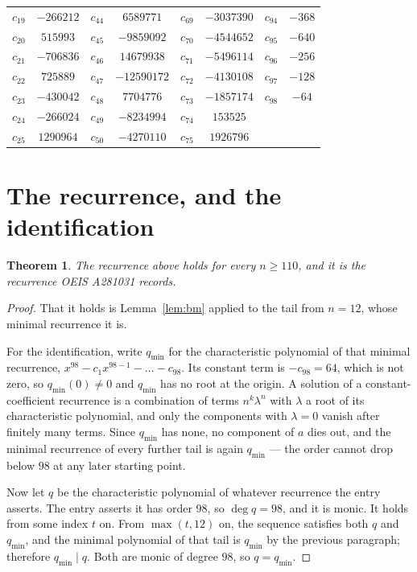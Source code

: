 \documentclass[11pt,a4paper]{article}
\theoremstyle{plain}
\newtheorem{theorem}{Theorem}
\theoremstyle{definition}
\begin{document}
\begin{center}
\begin{tabular}{cccccccc}
$c_{19}$ & $-266212$ & $c_{44}$ & $6589771$ & $c_{69}$ & $-3037390$ & $c_{94}$ & $-368$ \\
$c_{20}$ & $515993$ & $c_{45}$ & $-9859092$ & $c_{70}$ & $-4544652$ & $c_{95}$ & $-640$ \\
$c_{21}$ & $-706836$ & $c_{46}$ & $14679938$ & $c_{71}$ & $-5496114$ & $c_{96}$ & $-256$ \\
$c_{22}$ & $725889$ & $c_{47}$ & $-12590172$ & $c_{72}$ & $-4130108$ & $c_{97}$ & $-128$ \\
$c_{23}$ & $-430042$ & $c_{48}$ & $7704776$ & $c_{73}$ & $-1857174$ & $c_{98}$ & $-64$ \\
$c_{24}$ & $-266024$ & $c_{49}$ & $-8234994$ & $c_{74}$ & $153525$ &  &  \\
$c_{25}$ & $1290964$ & $c_{50}$ & $-4270110$ & $c_{75}$ & $1926796$ &  &  \\
\end{tabular}
\end{center}

\section{The recurrence, and the identification}

\begin{theorem}
The recurrence above holds for every $n\ge110$, and it is the recurrence OEIS A281031 records.
\end{theorem}

\begin{proof}
That it holds is Lemma~\ref{lem:bm} applied to the tail from $n=12$, whose minimal
recurrence it is.

For the identification, write $q_{\min}$ for the characteristic polynomial of that minimal
recurrence, $x^{98}-c_1x^{98-1}-\dots-c_{98}$. Its constant term is
$-c_{98}=64$, which is not zero, so $q_{\min}(0)\neq0$ and $q_{\min}$ has no
root at the origin. A solution of a constant-coefficient recurrence is a combination of terms
$n^{k}\lambda^{n}$ with $\lambda$ a root of its characteristic polynomial, and only the
components with $\lambda=0$ vanish after finitely many terms. Since $q_{\min}$ has none, no
component of $a$ dies out, and the minimal recurrence of every further tail is again
$q_{\min}$ --- the order cannot drop below $98$ at any later starting point.

Now let $q$ be the characteristic polynomial of whatever recurrence the entry asserts. The
entry asserts it has order $98$, so $\deg q=98$, and it is monic. It holds from some
index $t$ on. From $\max(t,12)$ on, the sequence satisfies both $q$ and $q_{\min}$, and
the minimal polynomial of that tail is $q_{\min}$ by the previous paragraph; therefore
$q_{\min}\mid q$. Both are monic of degree $98$, so $q=q_{\min}$.
\end{proof}
\end{document}
